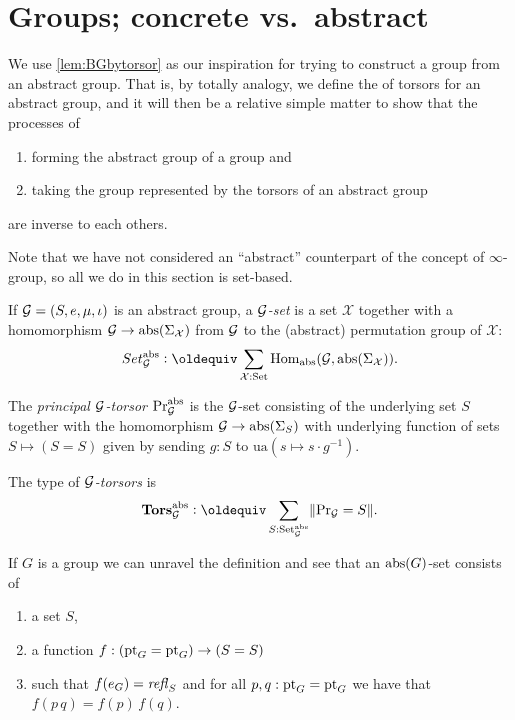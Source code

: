 \section{Groups; concrete vs.~abstract%
}
\label{sec:Gsetforabstract}

We use \cref{lem:BGbytorsor} as our inspiration for trying to construct a group from an abstract group.
That is, by totally analogy, we define the of torsors for an abstract group,
and it will then be a relative simple matter to show that the processes of
\begin{enumerate}
\item forming the abstract group of a group and 
\item taking the group represented by the torsors of an abstract group
\end{enumerate}
 are inverse to each others.

Note that we have not considered an ``abstract'' counterpart of the concept of $\infty$-group, so all we do in this section is set-based.

\begin{definition}
\label{def:abstrGtorsors}
  If ${\mathcal G}=(S,e,\mu,\iota)$ is an abstract group, a \emph{$\mathcal G$-set} is a set $\mathcal X$ together with a homomorphism
$\mathcal G\to\mathrm{abs}(\Sigma_{\mathcal X})$
from $\mathcal G$ to the (abstract) permutation group of $\mathcal X$:
$$Set_{\agp G}^\abstr\defequi \sum_{\mathcal X:\Set}\Hom_\abstr({\agp G},\abstr(\Sigma_{\mathcal X})).$$

The \emph{principal ${\mathcal G}$-torsor} $\mathrm{Pr}_{{\mathcal G}}^{\mathrm{abs}}$ is the ${\mathcal G}$-set consisting of the underlying set $S$ together with the homomorphism ${\mathcal G}\to\mathrm{abs}(\Sigma_{S})$ with underlying function of sets $S\mapsto (S=S)$ given by sending $g:S$ to $\mathrm{ua}(s\mapsto s\cdot g^{-1})$.

The type of \emph{${\mathcal G}$-torsors} is
$$\typetorsor_{\agp G}^\abstr\defequi\sum_{S:\Set_{\agp G}^\abstr}\Trunc{\princ {\agp G}=S}.$$
\end{definition}
\begin{example}
  If $G$ is a group we can unravel the definition and see that an $\mathrm{abs}(G)$-set consists of
  \begin{enumerate}
  \item a set $S$, 
  \item a function $f:(\mathrm{pt}_G=\mathrm{pt}_G)\to (S=S)$ 
  \item such that $f(e_G)=\mathop{\mathit{refl}_{S}}$ and for all $p,q:\mathrm{pt}_G=\mathrm{pt}_G$ we have that $f(p\, q)=f(p)\,f(q)$.
  \end{enumerate}

\end{example}


